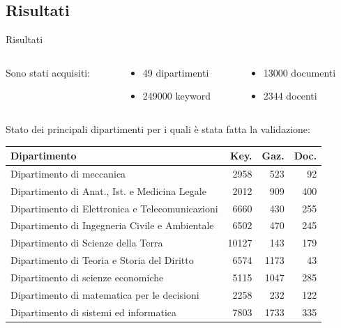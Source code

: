 \documentclass[dvips, 11pt]{beamer}
\begin{document}
\subsection{Risultati}

\begin{frame}{Risultati}
  \begin{columns}
    \begin{column}{0.3\textwidth}
      Sono stati acquisiti:
    \end{column}
    \begin{column}{0.35\textwidth}
      \begin{itemize}
      \item  \alert{49} dipartimenti
      \item  \alert{249000} keyword
      \end{itemize}
    \end{column}
    \begin{column}{0.35\textwidth}
      \begin{itemize}
      \item  \alert{13000} documenti
      \item  \alert{2344} docenti
      \end{itemize}
    \end{column}
  \end{columns}
  \pause
  \vspace{0.5cm}
  Stato dei principali dipartimenti per i quali \`e stata fatta la \alert{validazione}:
  \begin{tabular}{|p{8cm}|r|r|r|}
    \hline 
    \textbf{Dipartimento} & \textbf{Key.} & \textbf{Gaz.} & \textbf{Doc.} \\
    \hline 
    Dipartimento di meccanica & 2958 & 523 & 92 \\
    \hline
    Dipartimento di Anat., Ist. e Medicina Legale & 2012 & 909 & 400\\
    \hline
    Dipartimento di Elettronica e Telecomunicazioni & 6660 & 430 & 255\\
    \hline
    Dipartimento di Ingegneria Civile e Ambientale & 6502 & 470 & 245\\
    \hline
    Dipartimento di Scienze della Terra & 10127 & 143 & 179\\
    \hline
    Dipartimento di Teoria e Storia del Diritto & 6574 & 1173 & 43\\
    \hline
    Dipartimento di scienze economiche & 5115 & 1047 & 285\\
    \hline
    Dipartimento di matematica per le decisioni & 2258 & 232 & 122\\
    \hline
    Dipartimento di sistemi ed informatica & 7803 & 1733 & 335\\
    \hline
  \end{tabular}
\end{frame}
\end{document}
